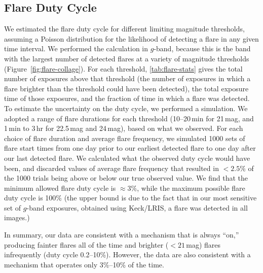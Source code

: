\documentclass{nature_plusfigure}
\begin{document}
\begin{methods}

\section{Flare Duty Cycle}
\label{sec:flare-duty-cycle}

We estimated the flare duty cycle for different limiting magnitude thresholds, assuming a Poisson distribution for the likelihood of detecting a flare in any given time interval. We performed the calculation in $g$-band, because this is the band with the largest number of detected flares at a variety of magnitude thresholds (Figure~\ref{fig:flare-collage}). 
For each threshold, \ref{tab:flare-stats} gives the total number of exposures above that threshold (the number of exposures in which a flare brighter than the threshold could have been detected), the total exposure time of those exposures, and the fraction of time in which a flare was detected. To estimate the uncertainty on the duty cycle, we performed a simulation. We adopted a range of flare durations for each threshold (10--20\,min for 21\,mag, and 1\,min to 3\,hr for 22.5\,mag and 24\,mag), based on what we observed. For each choice of flare duration and average flare frequency, we simulated 1000 sets of flare start times from one day prior to our earliest detected flare to one day after our last detected flare. We calculated what the observed duty cycle would have been, and discarded values of average flare frequency that resulted in $<2.5\%$ of the 1000 trials being above or below our true observed value. We find that the minimum allowed flare duty cycle is $\approx3\%$, while the maximum possible flare duty cycle is 100\% (the upper bound is due to the fact that in our most sensitive set of $g$-band exposures, obtained using Keck/LRIS, a flare was detected in all images.) 

In summary, our data are consistent with a mechanism that is always ``on,'' producing fainter flares all of the time and brighter ($<21\,$mag) flares infrequently (duty cycle 0.2--10\%). However, the data are also consistent with a mechanism that operates only 3\%--10\% of the time. 


\end{methods}
\end{document}

